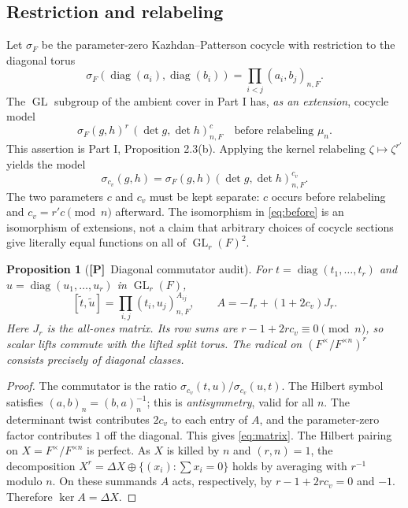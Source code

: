 \documentclass[11pt]{article}
\newcommand{\GL}{\operatorname{GL}}
\newcommand{\Ptag}{\textnormal{\textbf{[P]}}}
\theoremstyle{plain}
\newtheorem{proposition}[theorem]{Proposition}
\theoremstyle{definition}
\begin{document}
\subsection{Restriction and relabeling}
Let $\sigma_F$ be the parameter-zero Kazhdan--Patterson cocycle with
restriction to the diagonal torus
\begin{equation}\label{eq:parameterzero}
\sigma_F(\operatorname{diag}(a_i),\operatorname{diag}(b_i))
=\prod_{i<j}(a_i,b_j)_{n,F}.
\end{equation}
The $\GL$ subgroup of the ambient cover in Part I has, \emph{as an
extension}, cocycle model
\begin{equation}\label{eq:before}
  \sigma_F(g,h)^r\,(\det g,\det h)_{n,F}^{c}
  \quad\text{before relabeling }\mu_n.
\end{equation}
This assertion is Part I, Proposition 2.3(b).  Applying the
kernel relabeling $\zeta\mapsto\zeta^{r'}$ yields the model
\begin{equation}\label{eq:after}
 \sigma_{c_v}(g,h)=\sigma_F(g,h)
 (\det g,\det h)_{n,F}^{c_v}.
\end{equation}
The two parameters $c$ and $c_v$ must be kept separate: $c$
occurs before relabeling and $c_v=r'c\pmod n$ afterward.
The isomorphism in \eqref{eq:before} is an isomorphism of extensions,
not a claim that arbitrary choices of cocycle sections give
literally equal functions on all of $\GL_r(F)^2$.

\begin{proposition}[\Ptag\ Diagonal commutator audit]\label{prop:diag}
For $t=\operatorname{diag}(t_1,\ldots,t_r)$ and
$u=\operatorname{diag}(u_1,\ldots,u_r)$ in $\GL_r(F)$,
\begin{equation}\label{eq:matrix}
 [\widetilde t,\widetilde u]
 =\prod_{i,j}(t_i,u_j)_{n,F}^{A_{ij}},\qquad
 A=-I_r+(1+2c_v)J_r.
\end{equation}
Here $J_r$ is the all-ones matrix.  Its row sums are
$r-1+2rc_v\equiv0\pmod n$, so scalar lifts commute with the lifted
split torus.  The radical on $(F^\times/F^{\times n})^r$ consists
precisely of diagonal classes.
\end{proposition}
\begin{proof}
The commutator is the ratio
$\sigma_{c_v}(t,u)/\sigma_{c_v}(u,t)$.
The Hilbert symbol satisfies $(a,b)_n=(b,a)_n^{-1}$; this is
\emph{antisymmetry}, valid for all $n$.  The determinant twist
contributes $2c_v$ to each entry of $A$, and the parameter-zero
factor contributes $1$ off the diagonal.  This gives \eqref{eq:matrix}.
The Hilbert pairing on $X=F^\times/F^{\times n}$ is perfect.
As $X$ is killed by $n$ and $(r,n)=1$, the decomposition
$X^r=\Delta X\oplus\{(x_i):\sum x_i=0\}$ holds by averaging with
$r^{-1}$ modulo $n$.  On these summands $A$ acts, respectively, by
$r-1+2rc_v=0$ and $-1$.  Therefore $\ker A=\Delta X$.
\end{proof}
\end{document}
